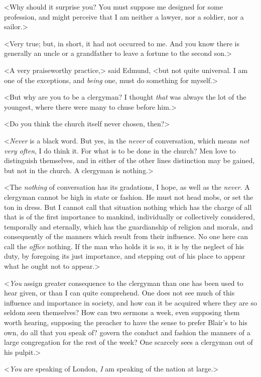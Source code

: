 <Why should it surprise you? You must suppose me designed for some profession, and might perceive that I am neither a lawyer, nor a soldier, nor a sailor.>

<Very true; but, in short, it had not occurred to me. And you know there is generally an uncle or a grandfather to leave a fortune to the second son.>

<A very praiseworthy practice,> said Edmund, <but not quite universal. I am one of the exceptions, and \textit{being}  one, must do something for myself.>

<But why are you to be a clergyman? I thought \textit{that}  was always the lot of the youngest, where there were many to chuse before him.>

<Do you think the church itself never chosen, then?>

<\textit{Never}  is a black word. But yes, in the \textit{never}  of conversation, which means \textit{not very often}, I do think it. For what is to be done in the church? Men love to distinguish themselves, and in either of the other lines distinction may be gained, but not in the church. A clergyman is nothing.>

<The \textit{nothing}  of conversation has its gradations, I hope, as well as the \textit{never}. A clergyman cannot be high in state or fashion. He must not head mobs, or set the ton in dress. But I cannot call that situation nothing which has the charge of all that is of the first importance to mankind, individually or collectively considered, temporally and eternally, which has the guardianship of religion and morals, and consequently of the manners which result from their influence. No one here can call the \textit{office}  nothing. If the man who holds it is so, it is by the neglect of his duty, by foregoing its just importance, and stepping out of his place to appear what he ought not to appear.>

<\textit{You}  assign greater consequence to the clergyman than one has been used to hear given, or than I can quite comprehend. One does not see much of this influence and importance in society, and how can it be acquired where they are so seldom seen themselves? How can two sermons a week, even supposing them worth hearing, supposing the preacher to have the sense to prefer Blair's to his own, do all that you speak of? govern the conduct and fashion the manners of a large congregation for the rest of the week? One scarcely sees a clergyman out of his pulpit.>

<\textit{You}  are speaking of London, \textit{I}  am speaking of the nation at large.>

